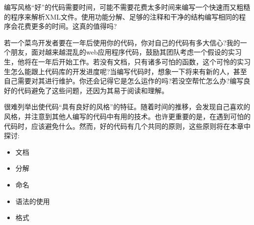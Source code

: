 
编写风格“好”的代码需要时间，可能不需要花费太多时间来编写一个快速而又粗糙的程序来解析XML文件。使用功能分解、足够的注释和干净的结构编写相同的程序会花费更多的时间。这真的值得吗?


若一个菜鸟开发者要在一年后使用你的代码，你对自己的代码有多大信心?我的一个朋友，面对越来越混乱的web应用程序代码，鼓励其团队考虑一个假设的实习生，他将在一年后开始工作。若没有文档，只有诸多可怕的函数，这个可怜的实习生怎么能跟上代码库的开发进度呢?当编写代码时，想象一下将来有新的人，甚至自己需要对其进行维护。你还会记得它是怎么运作的吗?若没空帮忙怎么办?编写良好的代码避免了这些问题，还因为其易于阅读和理解。


很难列举出使代码“具有良好的风格”的特征。随着时间的推移，会发现自己喜欢的风格，并注意到其他人编写的代码中有用的技术。也许更重要的是，在遇到可怕的代码时，应该避免什么。然而，好的代码有几个共同的原则，这些原则将在本章中探讨:

\begin{itemize}
\item
文档

\item
分解

\item
命名

\item
语法的使用

\item
格式
\end{itemize}





